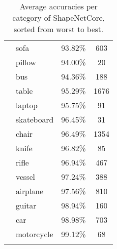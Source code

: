 \begin{table}[]
\begin{tabular}[t]{llcc}
		             & sofa              & 93.82\%           & 603            \\
		             & pillow            & 94.00\%           & 20             \\
		             & bus               & 94.36\%           & 188            \\
		             & table             & 95.29\%           & 1676           \\
		             & laptop            & 95.75\%           & 91             \\
		             & skateboard        & 96.45\%           & 31             \\
		             & chair             & 96.49\%           & 1354           \\
		             & knife             & 96.82\%           & 85             \\
		             & rifle             & 96.94\%           & 467            \\
		             & vessel            & 97.24\%           & 388            \\
		             & airplane          & 97.56\%           & 810            \\
		             & guitar            & 98.94\%           & 160            \\
		             & car               & 98.98\%           & 703            \\
		             & motorcycle        & 99.12\%           & 68             \\
		             &                   &                   &                \\ \hline
	\end{tabular}
	
	\caption{Average accuracies per category of ShapeNetCore, sorted from worst to best.}
	\label{Table:cataccs}
\end{table}